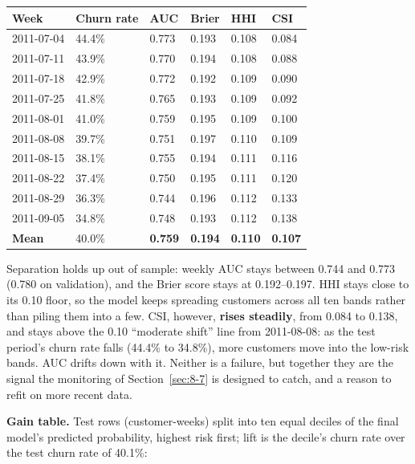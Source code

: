 \begin{center}
\begin{tabular}{@{}p{2.4cm}p{1.6cm}p{1.6cm}p{1.6cm}p{1.6cm}p{1.6cm}@{}}
    \toprule
    Week & Churn rate & AUC & Brier & HHI & CSI \\
    \midrule
    2011-07-04 & 44.4\% & 0.773 & 0.193 & 0.108 & 0.084 \\
    2011-07-11 & 43.9\% & 0.770 & 0.194 & 0.108 & 0.088 \\
    2011-07-18 & 42.9\% & 0.772 & 0.192 & 0.109 & 0.090 \\
    2011-07-25 & 41.8\% & 0.765 & 0.193 & 0.109 & 0.092 \\
    2011-08-01 & 41.0\% & 0.759 & 0.195 & 0.109 & 0.100 \\
    2011-08-08 & 39.7\% & 0.751 & 0.197 & 0.110 & 0.109 \\
    2011-08-15 & 38.1\% & 0.755 & 0.194 & 0.111 & 0.116 \\
    2011-08-22 & 37.4\% & 0.750 & 0.195 & 0.111 & 0.120 \\
    2011-08-29 & 36.3\% & 0.744 & 0.196 & 0.112 & 0.133 \\
    2011-09-05 & 34.8\% & 0.748 & 0.193 & 0.112 & 0.138 \\
    \midrule
    \textbf{Mean} & 40.0\% & \textbf{0.759} & \textbf{0.194} & \textbf{0.110} & \textbf{0.107} \\
    \bottomrule
\end{tabular}
\end{center}

Separation holds up out of sample: weekly AUC stays between 0.744 and 0.773 (0.780 on validation), and the Brier score stays at 0.192--0.197. HHI stays close to its 0.10 floor, so the model keeps spreading customers across all ten bands rather than piling them into a few. CSI, however, \textbf{rises steadily}, from 0.084 to 0.138, and stays above the 0.10 ``moderate shift'' line from 2011-08-08: as the test period's churn rate falls (44.4\% to 34.8\%), more customers move into the low-risk bands. AUC drifts down with it. Neither is a failure, but together they are the signal the monitoring of Section~\ref{sec:8-7} is designed to catch, and a reason to refit on more recent data.

\textbf{Gain table.} Test rows (customer-weeks) split into ten equal deciles of the final model's predicted probability, highest risk first; lift is the decile's churn rate over the test churn rate of 40.1\%:


